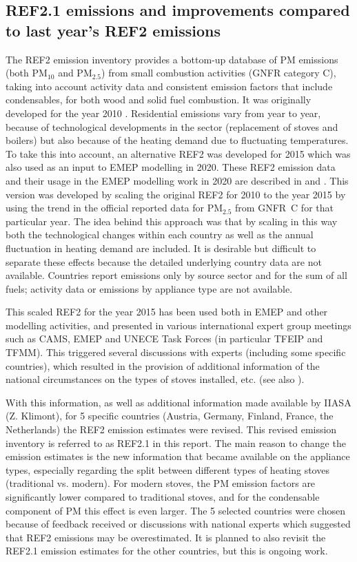 \subsection{REF2.1 emissions and improvements compared to last year's REF2 emissions}


The REF2 emission inventory provides a bottom-up database of PM emissions (both PM$_{10}$ and PM$_{2.5}$) from small combustion activities (GNFR category C), taking into account activity data and consistent emission factors that include condensables, for both wood and solid fuel combustion. It was originally developed for the year 2010 \citep{DeniervanderGon2015}. Residential emissions vary from year to year, because of technological developments in the sector (replacement of stoves and boilers) but also because of the heating demand due to fluctuating temperatures. To take this into account, an alternative REF2 was developed for 2015 which was also used as an input to EMEP modelling in 2020. These REF2 emission data and their usage in the EMEP modelling work in 2020 are described in  \citet{R2020:CAMSREF2} and \citet{R2020:SVOC}. This version was developed by scaling the original REF2 for 2010 to the year 2015 by using the trend in the official reported data for PM$_{2.5}$ from GNFR~C for that particular year. The idea behind this approach was that by scaling in this way both the technological changes within each country as well as the annual fluctuation in heating demand are included. It is desirable but difficult to separate these effects because the detailed underlying country data are not available. Countries report emissions only by source sector and for the sum of all fuels; activity data or emissions by appliance type are not available.

This scaled REF2 for the year 2015 has been used both in EMEP and other modelling activities, and presented in various international expert group meetings such as CAMS, EMEP and UNECE Task Forces (in particular TFEIP and TFMM). This triggered several discussions with experts (including some specific countries), which resulted in the provision of additional information of the national circumstances on the types of stoves installed, etc. (see also \cite{CONDws2020}). 

With this information, as well as additional information made available by IIASA (Z. Klimont), for 5 specific countries (Austria, Germany, Finland, France, the Netherlands) the REF2 emission estimates were revised. This revised emission inventory is referred to as REF2.1 in this report. The main reason to change the emission estimates is the new information that became available on the appliance types, especially regarding the split between different types of heating stoves (traditional vs. modern). For modern stoves, the PM emission factors are significantly lower compared to traditional stoves, and for the condensable component of PM this effect is even larger.
The 5 selected countries were chosen because of feedback received or discussions with national experts which suggested that REF2 emissions may be overestimated. It is planned to also revisit the REF2.1 emission estimates for the other countries, but this is ongoing work.

